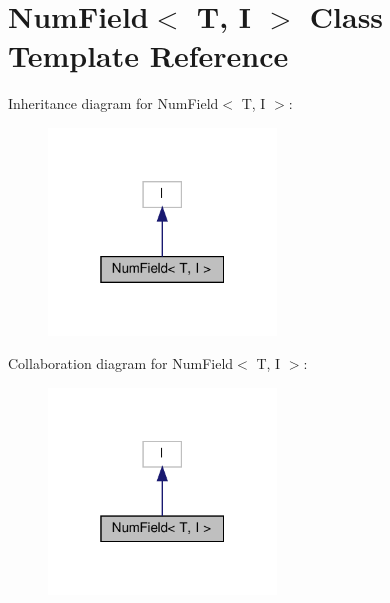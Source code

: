 \hypertarget{classNumField}{}\section{Num\+Field$<$ T, I $>$ Class Template Reference}
\label{classNumField}


Inheritance diagram for Num\+Field$<$ T, I $>$\+:\nopagebreak
\begin{figure}[H]
\begin{center}
\leavevmode
\includegraphics[width=172pt]{classNumField__inherit__graph}
\end{center}
\end{figure}


Collaboration diagram for Num\+Field$<$ T, I $>$\+:\nopagebreak
\begin{figure}[H]
\begin{center}
\leavevmode
\includegraphics[width=172pt]{classNumField__coll__graph}
\end{center}
\end{figure}
